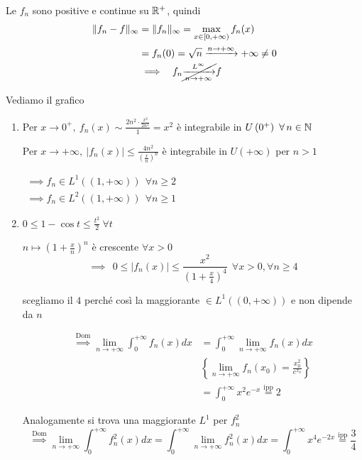 Le $f_{n}$ sono positive e continue su $\mathbb{R}^{+}$, quindi
\begin{equation*}
\begin{aligned}
\| f_{n} - f\|_{\infty} & = \| f_{n} \|_{\infty} = \max_{x\in [ 0, + \infty)} f_{n}(x)\\
 & = f_{n}(0) = \sqrt{n}\xrightarrow{n\rightarrow + \infty} + \infty \neq 0\\
 & \implies \ \ f_{n}\cancel{\xrightarrow[n\rightarrow + \infty ]{L^{\infty}}} f
\end{aligned}
\end{equation*}

\Soluzione

Vediamo il grafico

\begin{enumerate}
\item Per $x\rightarrow 0^{+}, \ f_{n}(x) \sim \frac{2n^{2} \cdot \frac{x^{2}}{2n^{2}}}{1} = x^{2}$ è integrabile in $U\left(0^{+}\right) \ \forall n\in \NN $

Per $x\rightarrow + \infty, \ | f_{n}(x)| \leq \frac{4n^{2}}{\left(\frac{x}{n}\right)^{n}}$ è integrabile in $U(+ \infty)$ per $n > 1$

$
\begin{array}{l}
\implies f_{n} \in L^{1}((1, + \infty)) \ \ \forall n \geq 2\\
\implies f_{n} \in L^{2}((1, + \infty)) \ \ \forall n \geq 1
\end{array}$
\item $0 \leq 1 - \cos t \leq \frac{t^{2}}{2} \ \forall t$

$n\mapsto \left(1 + \frac{x}{n}\right)^{n}$ è crescente $\forall x > 0$
\begin{equation*}
\implies \ \ 0 \leq | f_{n} (x)| \leq \frac{x^{2}}{\left(1 + \frac{x}{4}\right)^{4}} \ \ \forall x > 0, \forall n \geq 4
\end{equation*}

scegliamo il $4$ perché così la maggiorante $\in L^{1}((0, + \infty))$ e non dipende da $n$

\begin{equation*}
\begin{aligned}
\overset{\text{Dom}}{\implies}\lim\limits_{n\rightarrow + \infty}\int^{+ \infty}_{0} f_{n}(x) dx & = \int^{+ \infty}_{0}\lim\limits_{n\rightarrow + \infty} f_{n}(x) dx\\
 & \left\{\lim\limits_{n\rightarrow + \infty} f_{n}(x_{0}) = \frac{x^{2}_{0}}{e^{x_{0}}}\right\}\\
 & = \int^{+ \infty}_{0} x^{2} e^{- x}\overset{\text{ipp}}{=} 2
\end{aligned}
\end{equation*}

Analogamente si trova una maggiorante $L^{1}$ per $f^{2}_{n}$
\begin{equation*}
\overset{\text{Dom}}{\implies}\lim\limits_{n\rightarrow + \infty}\int^{+ \infty}_{0} f^{2}_{n}(x) dx = \int^{+ \infty}_{0}\lim\limits_{n\rightarrow + \infty} f^{2}_{n}(x) dx = \int^{+ \infty}_{0} x^{4} e^{- 2x}\overset{\text{ipp}}{=}\frac{3}{4}
\end{equation*}
\end{enumerate}

